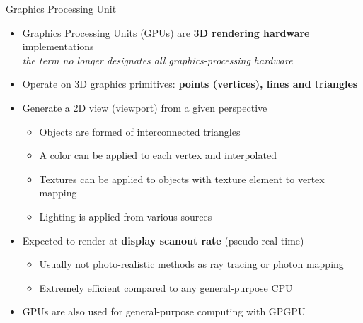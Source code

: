 \begin{frame}{Graphics Processing Unit}
  \begin{itemize}
  \item Graphics Processing Units (GPUs) are \textbf{3D rendering hardware} implementations\\
    \textit{the term no longer designates all graphics-processing hardware}
  \item Operate on 3D graphics primitives: \textbf{points (vertices), lines and triangles}
  \item Generate a 2D view (viewport) from a given perspective
    \begin{itemize}
      \item Objects are formed of interconnected triangles
      \item A color can be applied to each vertex and interpolated
      \item Textures can be applied to objects with texture element to vertex mapping
      \item Lighting is applied from various sources
    \end{itemize}
  \item Expected to render at \textbf{display scanout rate} (pseudo real-time)
    \begin{itemize}
    \item Usually not photo-realistic methods as ray tracing or photon mapping
    \item Extremely efficient compared to any general-purpose CPU
    \end{itemize}
  \item GPUs are also used for general-purpose computing with GPGPU
  \end{itemize}
\end{frame}

